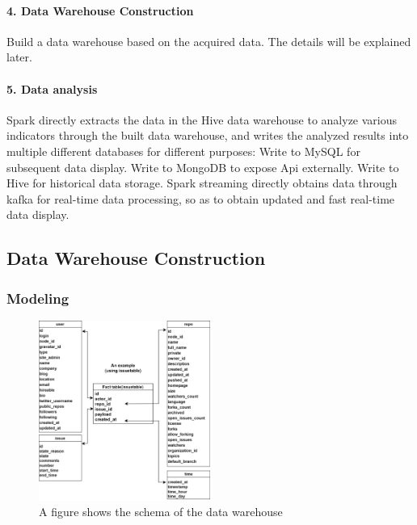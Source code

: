 \paragraph*{4. Data Warehouse Construction}
Build a data warehouse based on the acquired data. The details will be explained later.

\paragraph*{5. Data analysis}
Spark directly extracts the data in the Hive data warehouse to analyze various indicators through the built data warehouse, and writes the analyzed results into multiple different databases for different purposes:
Write to MySQL for subsequent data display.
Write to MongoDB to expose Api externally.
Write to Hive for historical data storage.
Spark streaming directly obtains data through kafka for real-time data processing, so as to obtain updated and fast real-time data display.




\subsection{Data Warehouse Construction}



\subsubsection{Modeling}


\begin{figure}[H]
    \centering
    \includegraphics[width=0.5\textwidth]{./pic/tables.png}
    \caption{A figure shows the schema of the data warehouse}
    \label{fig:tables}
\end{figure}



